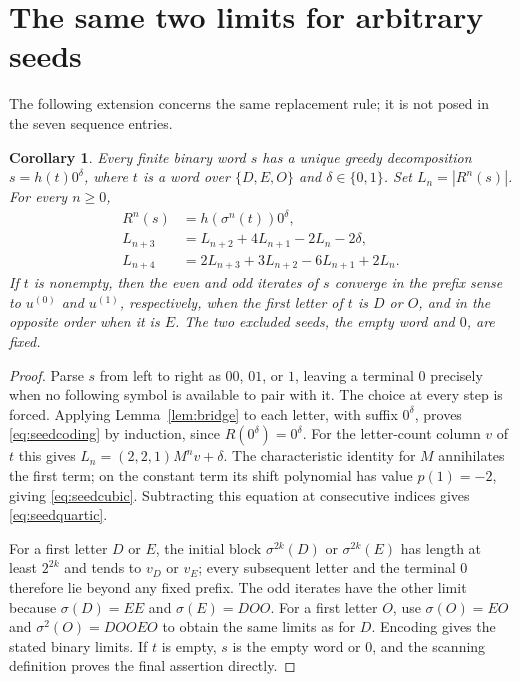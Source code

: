 \documentclass[11pt]{article}
\newtheorem{corollary}[theorem]{Corollary}
\begin{document}
\section{The same two limits for arbitrary seeds}
The following extension concerns the same replacement rule; it is not
posed in the seven sequence entries.
\begin{corollary}\label{cor:seeds}
Every finite binary word $s$ has a unique greedy decomposition
$s=h(t)0^\delta$, where $t$ is a word over $\{D,E,O\}$ and
$\delta\in\{0,1\}$. Set $L_n=|R^n(s)|$. For every $n\geq0$,
\begin{align}
R^n(s)&=h(\sigma^n(t))0^\delta,\label{eq:seedcoding}\\
L_{n+3}&=L_{n+2}+4L_{n+1}-2L_n-2\delta,\label{eq:seedcubic}\\
L_{n+4}&=2L_{n+3}+3L_{n+2}-6L_{n+1}+2L_n.\label{eq:seedquartic}
\end{align}
If $t$ is nonempty, then the even and odd iterates of $s$ converge
in the prefix sense to $u^{(0)}$ and $u^{(1)}$, respectively, when
the first letter of $t$ is $D$ or $O$, and in the opposite order when
it is $E$. The two excluded seeds, the empty word and $0$, are fixed.
\end{corollary}
\begin{proof}
Parse $s$ from left to right as $00$, $01$, or $1$, leaving a terminal
$0$ precisely when no following symbol is available to pair with it.
The choice at every step is forced. Applying
Lemma~\ref{lem:bridge} to each letter, with suffix $0^\delta$, proves
\eqref{eq:seedcoding} by induction, since $R(0^\delta)=0^\delta$.
For the letter-count column $v$ of $t$ this gives
$L_n=(2,2,1)M^nv+\delta$. The characteristic identity for $M$
annihilates the first term; on the constant term its shift polynomial
has value $p(1)=-2$, giving \eqref{eq:seedcubic}.
Subtracting this equation at consecutive indices gives
\eqref{eq:seedquartic}.

For a first letter $D$ or $E$, the initial block
$\sigma^{2k}(D)$ or $\sigma^{2k}(E)$ has length at least $2^{2k}$
and tends to $v_D$ or $v_E$; every subsequent letter and the terminal
$0$ therefore lie beyond any fixed prefix. The odd iterates have the
other limit because $\sigma(D)=EE$ and $\sigma(E)=DOO$.
For a first letter $O$, use
$\sigma(O)=EO$ and $\sigma^2(O)=DOOEO$ to obtain the same limits
as for $D$. Encoding gives the stated binary limits.
If $t$ is empty, $s$ is the empty word or $0$, and the scanning
definition proves the final assertion directly.
\end{proof}
\end{document}
